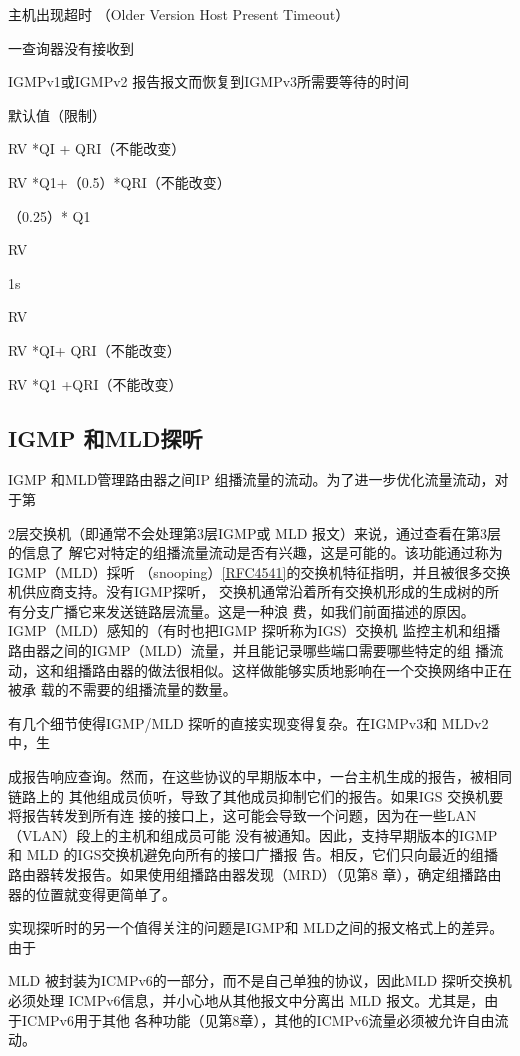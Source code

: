 主机出现超时 （Older Version Host Present Timeout）

一查询器没有接收到

IGMPv1或IGMPv2 报告报文而恢复到IGMPv3所需要等待的时间

默认值（限制）

RV *QI + QRI（不能改变）

RV *Q1+（0.5）*QRI（不能改变）

（0.25）* Q1

RV

1s

RV

RV *QI+ QRI（不能改变）

RV *Q1 +QRI（不能改变）

\subsection{IGMP 和MLD探听}
IGMP 和MLD管理路由器之间IP 组播流量的流动。为了进一步优化流量流动，对于第

2层交换机（即通常不会处理第3层IGMP或 MLD 报文）来说，通过查看在第3层的信息了
解它对特定的组播流量流动是否有兴趣，这是可能的。该功能通过称为 IGMP（MLD）採听
（snooping）\href{https://www.rfc-editor.org/rfc/rfc4541}{[RFC4541]}的交换机特征指明，并且被很多交换机供应商支持。没有IGMP探听，
交换机通常沿着所有交换机形成的生成树的所有分支广播它来发送链路层流量。这是一种浪
费，如我们前面描述的原因。IGMP（MLD）感知的（有时也把IGMP 探听称为IGS）交换机
监控主机和组播路由器之间的IGMP（MLD）流量，并且能记录哪些端口需要哪些特定的组
播流动，这和组播路由器的做法很相似。这样做能够实质地影响在一个交换网络中正在被承
载的不需要的组播流量的数量。

有几个细节使得IGMP/MLD 探听的直接实现变得复杂。在IGMPv3和 MLDv2中，生

成报告响应查询。然而，在这些协议的早期版本中，一台主机生成的报告，被相同链路上的
其他组成员侦听，导致了其他成员抑制它们的报告。如果IGS 交换机要将报告转发到所有连
接的接口上，这可能会导致一个问题，因为在一些LAN（VLAN）段上的主机和组成员可能
没有被通知。因此，支持早期版本的IGMP 和 MLD 的IGS交换机避免向所有的接口广播报
告。相反，它们只向最近的组播路由器转发报告。如果使用组播路由器发现（MRD）（见第8
章），确定组播路由器的位置就变得更简单了。

实现探听时的另一个值得关注的问题是IGMP和 MLD之间的报文格式上的差异。由于

MLD 被封装为ICMPv6的一部分，而不是自己单独的协议，因此MLD 探听交换机必须处理
ICMPv6信息，并小心地从其他报文中分离出 MLD 报文。尤其是，由于ICMPv6用于其他
各种功能（见第8章），其他的ICMPv6流量必须被允许自由流动。

